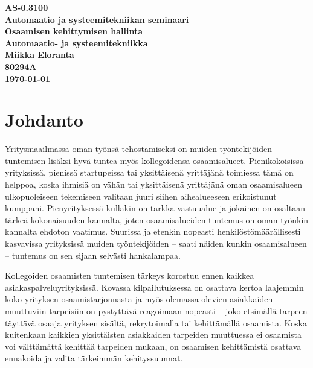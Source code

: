 \documentclass[a4paper,finnish,12pt]{article}
\begin{document}
\thispagestyle{empty}

\begin{titlepage}
    \centering
    \vspace*{10\baselineskip}
    \Large
    \bfseries
    AS-0.3100 \\ Automaatio ja systeemitekniikan seminaari \\
    \vspace{\baselineskip}
    \huge
    Osaamisen kehittymisen hallinta \\
    [1.5\baselineskip]
    \normalfont
    \vfill
    \small
    Automaatio- ja systeemitekniikka \\
    \vfill
    Miikka Eloranta \\
    80294A \\[2\baselineskip]
    \textbf{\today} \\[2\baselineskip]
    \vfill


\end{titlepage}


\clearpage

\tableofcontents

\clearpage

\section{Johdanto}


Yritysmaailmassa oman työnsä tehostamiseksi on muiden työntekijöiden tuntemisen lisäksi hyvä tuntea myös kollegoidensa osaamisalueet. Pienikokoisissa yrityksissä, pienissä startupeissa tai yksittäisenä yrittäjänä toimiessa tämä on helppoa, koska ihmisiä on vähän tai yksittäisenä yrittäjänä oman osaamisalueen ulkopuoleiseen tekemiseen valitaan juuri siihen aihealueeseen erikoistunut kumppani. Pienyrityksessä kullakin on tarkka vastuualue ja jokainen on osaltaan tärkeä kokonaisuuden kannalta, joten osaamisalueiden tuntemus on oman työnkin kannalta ehdoton vaatimus. Suurissa ja etenkin nopeasti henkilöstömäärällisesti kasvavissa yrityksissä muiden työntekijöiden -- saati näiden kunkin osaamisalueen -- tuntemus on sen sijaan selvästi hankalampaa.

Kollegoiden osaamisten tuntemisen tärkeys korostuu ennen kaikkea asiakaspalveluyrityksissä. Kovassa kilpailutuksessa on osattava kertoa laajemmin koko yrityksen osaamistarjonnasta ja myös olemassa olevien asiakkaiden muuttuviin tarpeisiin on pystyttävä reagoimaan nopeasti -- joko etsimällä tarpeen täyttävä osaaja yrityksen sisältä, rekrytoimalla tai kehittämällä osaamista. Koska kuitenkaan kaikkien yksittäisten asiakkaiden tarpeiden muuttuessa ei osaamista voi välttämättä kehittää tarpeiden mukaan, on osaamisen kehittämistä osattava ennakoida ja valita tärkeimmän kehityssuunnat.
\end{document}
